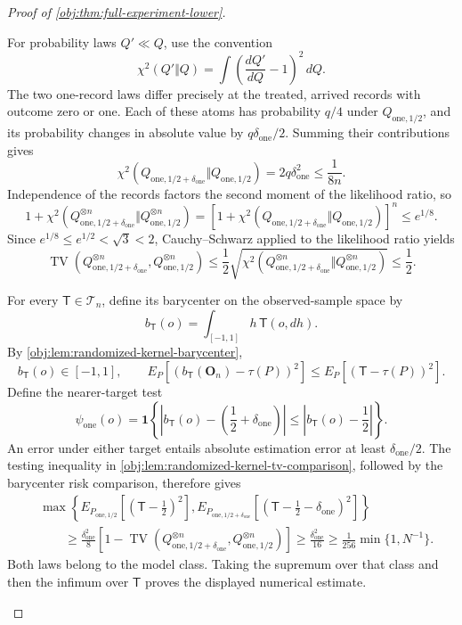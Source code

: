 \documentclass[11pt]{article}
\begin{document}
\begin{proof}[Proof of \cref{obj:thm:full-experiment-lower}]
\begin{enumerate}
For probability laws \(Q'\ll Q\), use the convention
\[
\chi^2(Q'\Vert Q)
=\int\left(\frac{dQ'}{dQ}-1\right)^2\,dQ.
\]
The two one-record laws differ precisely at the treated, arrived records with
outcome zero or one. Each of these atoms has probability \(q/4\) under
\(Q_{\mathrm{one},1/2}\), and its probability changes in absolute value by
\(q\delta_{\mathrm{one}}/2\). Summing their contributions gives
\[
\chi^2\!\left(
Q_{\mathrm{one},1/2+\delta_{\mathrm{one}}}
\Vert Q_{\mathrm{one},1/2}\right)
=2q\delta_{\mathrm{one}}^2
\le\frac{1}{8n}.
\]
Independence of the records factors the second moment of the likelihood ratio,
so
\[
1+\chi^2\!\left(
Q_{\mathrm{one},1/2+\delta_{\mathrm{one}}}^{\otimes n}
\Vert Q_{\mathrm{one},1/2}^{\otimes n}\right)
=
\left[
1+\chi^2\!\left(
Q_{\mathrm{one},1/2+\delta_{\mathrm{one}}}
\Vert Q_{\mathrm{one},1/2}\right)
\right]^n
\le e^{1/8}.
\]
Since \(e^{1/8}\le e^{1/2}<\sqrt3<2\), Cauchy--Schwarz applied to the
likelihood ratio yields
\[
\operatorname{TV}\!\left(
Q_{\mathrm{one},1/2+\delta_{\mathrm{one}}}^{\otimes n},
Q_{\mathrm{one},1/2}^{\otimes n}\right)
\le
\frac12\sqrt{
\chi^2\!\left(
Q_{\mathrm{one},1/2+\delta_{\mathrm{one}}}^{\otimes n}
\Vert Q_{\mathrm{one},1/2}^{\otimes n}\right)}
\le\frac12.
\]

For every \(\mathsf T\in\mathcal T_n\), define its barycenter on the
observed-sample space by
\[
b_{\mathsf T}(o)=\int_{[-1,1]}h\,\mathsf T(o,dh).
\]
By \cref{obj:lem:randomized-kernel-barycenter},
\[
b_{\mathsf T}(o)\in[-1,1],
\qquad
E_P[(b_{\mathsf T}(\mathbf O_n)-\tau(P))^2]
\le E_P[(\mathsf T-\tau(P))^2].
\]
Define the nearer-target test
\[
\psi_{\mathrm{one}}(o)
=
\mathbf1\left\{
\left|b_{\mathsf T}(o)-\left(\frac12+\delta_{\mathrm{one}}\right)\right|
\le
\left|b_{\mathsf T}(o)-\frac12\right|
\right\}.
\]
An error under either target entails absolute estimation error at least
\(\delta_{\mathrm{one}}/2\). The testing inequality in
\cref{obj:lem:randomized-kernel-tv-comparison}, followed by the barycenter
risk comparison, therefore gives
\[
\begin{aligned}
&\max\left\{
E_{P_{\mathrm{one},1/2}}\!\left[(\mathsf T-\tfrac12)^2\right],
E_{P_{\mathrm{one},1/2+\delta_{\mathrm{one}}}}\!
\left[(\mathsf T-\tfrac12-\delta_{\mathrm{one}})^2\right]
\right\}\\
&\qquad\ge
\frac{\delta_{\mathrm{one}}^2}{8}
\left[
1-\operatorname{TV}\!\left(
Q_{\mathrm{one},1/2+\delta_{\mathrm{one}}}^{\otimes n},
Q_{\mathrm{one},1/2}^{\otimes n}\right)
\right]
\ge\frac{\delta_{\mathrm{one}}^2}{16}
\ge\frac1{256}\min\{1,N^{-1}\}.
\end{aligned}
\]
Both laws belong to the model class. Taking the supremum over that class and
then the infimum over \(\mathsf T\) proves the displayed numerical estimate.


\end{enumerate}
\end{proof}
\end{document}
